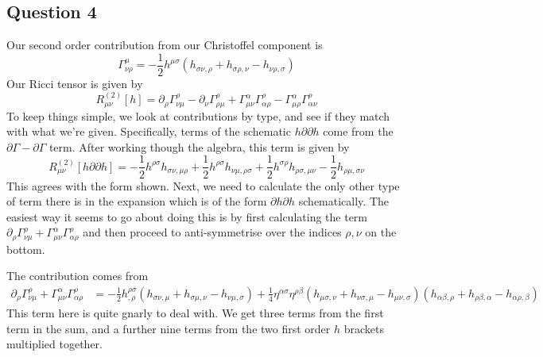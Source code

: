 \documentclass[11pt, a4paper]{article}   	%
\theoremstyle{slplain}
\begin{document}
\subsection{Question 4}
Our second order contribution from 
our Christoffel component is 
\[
\Gamma ^ \mu _{ \nu \rho }  = - \frac{1}{2 } h ^{ \mu \sigma } ( h_{ \sigma \nu , \rho } 
+ h _{ \sigma \rho , \nu }  - h _{ \nu \rho , \sigma } 	 )
\] Our Ricci tensor is given by 
\[
R_{ \mu \nu } ^{ \left(  2  \right)  } \left[  h  \right]   = 
\partial  _ \rho \Gamma ^{ \rho } _{ \nu \mu }  - \partial  _ \nu \Gamma ^{ \rho } _{ \rho \mu } 
+ \Gamma ^{ \alpha } _{ \mu \nu } \Gamma ^{ \rho } _{ \alpha \rho }  - 
\Gamma ^{ \alpha } _{ \mu \rho } \Gamma ^{ \rho } _{ \alpha \nu } 
\] To keep things simple, we look at contributions 
by type, and see if they match with what we're given. 
Specifically, terms of the schematic $ h \partial  \partial  h $ 
come from the $ \partial  \Gamma  - \partial  \Gamma $ term. 
After working though the algebra, this term is given by 
\[
R_{ \mu \nu } ^{ \left(  2  \right)  } \left[  h \partial  \partial  h  \right]  
=  - \frac{1}{2 } h ^{ \rho \sigma } h_{ \sigma \nu , \mu \rho } + \frac{1}{2 } 
h ^{ \rho \sigma } h _{ \nu \mu , \rho \sigma  } + 
\frac{1}{2 } h ^{ \sigma \rho } h _{ \rho \sigma, \mu \nu } - \frac{1}{2 } 
h _{ \rho \mu , \sigma \nu } 
\] This agrees with the form shown.
Next, we need to calculate the only other type of 
term there is in the expansion which is of the form $ \partial  h \partial  h $ 
schematically. 
The easiest way it seems to go about doing this 
is by first calculating the term $ \partial  _ \rho \Gamma ^ \rho_{ \nu \mu }  + \Gamma ^{ \alpha } _{ \mu \nu } \Gamma ^{ \rho } _{ \alpha \rho }$ and then proceed to 
anti-symmetrise over the indices $ \rho , \nu $ on the bottom.

The contribution 
comes from 
\begin{align*}
\partial  _ \rho \Gamma ^ \rho_{ \nu \mu }  + \Gamma ^{ \alpha } _{ \mu \nu } \Gamma ^{ \rho } _{ \alpha \rho } &=   - \frac{1}{2 } h ^{ \rho \sigma } _{ , \rho } \left(  h _{ \sigma \nu , \mu } 
+ h _{ \sigma \mu , \nu }  - h _{ \nu \mu , \sigma } \right)  + 
\frac{1}{4 } \eta ^{ \alpha \sigma } \eta ^{ \rho \beta } \left(  
h_{ \mu \sigma , \nu } + h _{ \nu \sigma , \mu }  - h _{ \mu \nu , \sigma } \right)  \left( 
h_{ \alpha \beta, \rho } + h _{ \rho \beta , \alpha }  - h _{ \alpha \rho , \beta }  \right)  
\end{align*}
This term here is quite gnarly to deal with. 
We get three terms from the first term in the sum, 
and a further nine terms from the two first order $ h $ brackets multiplied together. 
\end{document}
